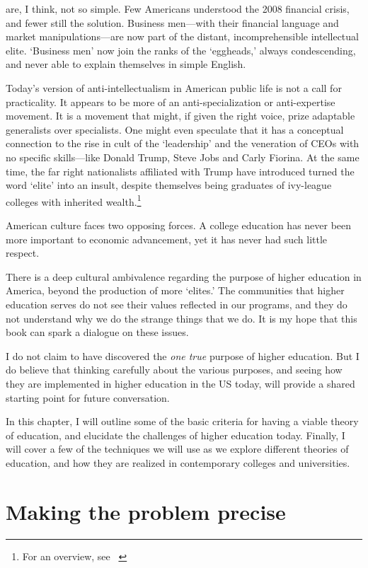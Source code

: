  are, I think, not so simple. Few Americans understood the 2008 financial crisis, and fewer still the solution. Business men---with their financial language and market manipulations---are now part of the distant, incomprehensible intellectual elite. `Business men' now join the ranks of the `eggheads,' always condescending, and never able to explain themselves in simple English.

Today's version of anti-intellectualism in American public life is not a call for practicality. It appears to be more of an anti-specialization or anti-expertise movement. It is a movement that might, if given the right voice, prize adaptable generalists over specialists. One might even speculate that it has a conceptual connection to the rise in cult of the `leadership' and the veneration of CEOs with no specific skills---like Donald Trump, Steve Jobs and Carly Fiorina. At the same time, the far right nationalists affiliated with Trump have introduced turned the word `elite' into an insult, despite themselves being graduates of ivy-league colleges with inherited wealth.\footnote{For an overview, see ~\citep{Anonymous:2017vr}}

American culture faces two opposing forces. A college education has never been more important to economic advancement, yet it has never had such little respect.

There is a deep cultural ambivalence regarding the purpose of higher education in America, beyond the production of more `elites.' The communities that higher education serves do not see their values reflected in our programs, and they do not understand why we do the strange things that we do. It is my hope that this book can spark a dialogue on these issues. 

I do not claim to have discovered the \emph{one true} purpose of higher education. But I do believe that thinking carefully about the various purposes, and seeing how they are implemented in higher education in the US today, will provide a shared starting point for future conversation.

In this chapter, I will outline some of the basic criteria for having a viable theory of education, and elucidate the challenges of higher education today. Finally, I will cover a few of the techniques we will use as we explore different theories of education, and how they are realized in contemporary colleges and universities.

\section{Making the problem precise}
\label{makingtheproblemprecise}

